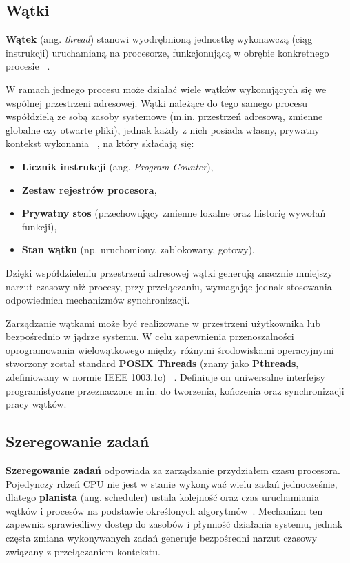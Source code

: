\subsection{Wątki}
\textbf{Wątek} (ang. \textit{thread}) stanowi wyodrębnioną jednostkę wykonawczą (ciąg instrukcji) uruchamianą na procesorze, funkcjonującą w obrębie konkretnego procesie ~\cite{Tanenbaum}. 

W ramach jednego procesu może działać wiele wątków wykonujących się we wspólnej przestrzeni adresowej. Wątki należące do tego samego procesu współdzielą ze sobą zasoby systemowe (m.in. przestrzeń adresową, zmienne globalne czy otwarte pliki), jednak każdy z nich posiada własny, prywatny kontekst wykonania ~\cite{Tanenbaum}, na który składają się:
\begin{itemize}
    \item \textbf{Licznik instrukcji} (ang. \textit{Program Counter}),
    \item \textbf{Zestaw rejestrów procesora},
    \item \textbf{Prywatny stos} (przechowujący zmienne lokalne oraz historię wywołań funkcji),
    \item \textbf{Stan wątku} (np. uruchomiony, zablokowany, gotowy).
\end{itemize}
Dzięki współdzieleniu przestrzeni adresowej wątki generują znacznie mniejszy narzut czasowy niż procesy, przy przełączaniu, wymagając jednak stosowania odpowiednich mechanizmów synchronizacji.

Zarządzanie wątkami może być realizowane w przestrzeni użytkownika lub bezpośrednio w jądrze systemu.
W celu zapewnienia przenoszalności oprogramowania wielowątkowego między różnymi środowiskami operacyjnymi stworzony został standard \textbf{POSIX Threads} (znany jako \textbf{Pthreads}, zdefiniowany w normie IEEE 1003.1c) ~\cite{Tanenbaum}. Definiuje on uniwersalne interfejsy programistyczne przeznaczone m.in. do tworzenia, kończenia oraz synchronizacji pracy wątków.

\subsection{Szeregowanie zadań}
\textbf{Szeregowanie zadań} odpowiada za zarządzanie przydziałem czasu procesora. Pojedynczy rdzeń CPU nie jest w stanie wykonywać wielu zadań jednocześnie, dlatego \textbf{planista} (ang. scheduler) ustala kolejność oraz czas uruchamiania wątków i procesów na podstawie określonych algorytmów~\cite{Abraham_Silberschatz}.
Mechanizm ten zapewnia sprawiedliwy dostęp do zasobów i płynność działania systemu, jednak częsta zmiana wykonywanych zadań generuje bezpośredni narzut czasowy związany z przełączaniem kontekstu. 
